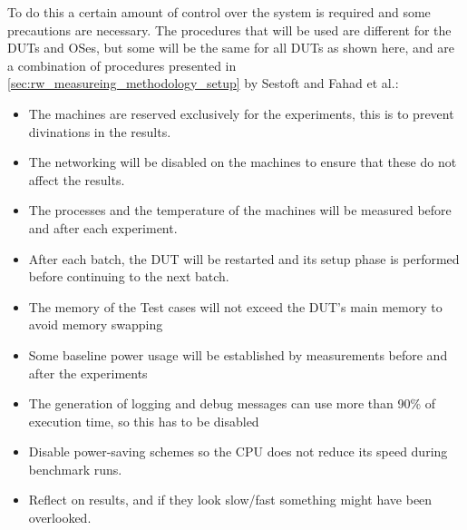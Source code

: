 To do this a certain amount of control over the system is required and some precautions are necessary. The procedures that will be used are different for the DUTs and OSes, but some will be the same for all DUTs as shown here, and are a combination of procedures presented in \cref{sec:rw_measureing_methodology_setup} by Sestoft\cite*[]{sestoft2013microbenchmarks} and Fahad et al.\cite*[]{fahad2019comparative}:

\begin{itemize}
    \item The machines are reserved exclusively for the experiments, this is to prevent divinations in the results.
    \item The networking will be disabled on the machines to ensure that these do not affect the results.
    \item The processes and the temperature of the machines will be measured before and after each experiment.
    \item After each batch, the DUT will be restarted and its setup phase is performed before continuing to the next batch.
    \item The memory of the Test cases will not exceed the DUT's main memory to avoid memory swapping
    \item Some baseline power usage will be established by measurements before and after the experiments
    \item The generation of logging and debug messages can use more than 90\% of execution time, so this has to be disabled
    \item Disable power-saving schemes so the CPU does not reduce its speed during benchmark runs.
    \item Reflect on results, and if they look slow/fast something might have been overlooked.
\end{itemize}

